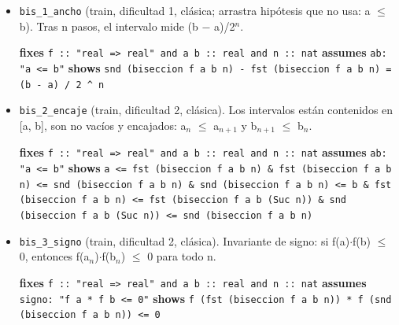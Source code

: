 \documentclass[11pt,a4paper]{article}
\begin{document}
\begin{itemize}
  \item \texttt{bis\_\allowbreak{}1\_\allowbreak{}ancho} (train, dificultad 1, clásica; arrastra hipótesis que no usa: a $\le $ b). Tras n pasos, el intervalo mide (b $-$ a)/2$^{n}$.\\
  {\footnotesize \textbf{fixes} \texttt{f :\allowbreak{}:\allowbreak{} "real =\allowbreak{}> real" and a b :\allowbreak{}:\allowbreak{} real and n :\allowbreak{}:\allowbreak{} nat} \textbf{assumes} \texttt{ab:\allowbreak{} "a <=\allowbreak{} b"} \textbf{shows} \texttt{snd (\allowbreak{}biseccion f a b n) -\allowbreak{} fst (\allowbreak{}biseccion f a b n) =\allowbreak{} (\allowbreak{}b -\allowbreak{} a) /\allowbreak{} 2 \textasciicircum{} n}\par}
  \item \texttt{bis\_\allowbreak{}2\_\allowbreak{}encaje} (train, dificultad 2, clásica). Los intervalos están contenidos en [a, b], son no vacíos y encajados: a$_{n}$ $\le $ a$_{n+1}$ y b$_{n+1}$ $\le $ b$_{n}$.\\
  {\footnotesize \textbf{fixes} \texttt{f :\allowbreak{}:\allowbreak{} "real =\allowbreak{}> real" and a b :\allowbreak{}:\allowbreak{} real and n :\allowbreak{}:\allowbreak{} nat} \textbf{assumes} \texttt{ab:\allowbreak{} "a <=\allowbreak{} b"} \textbf{shows} \texttt{a <=\allowbreak{} fst (\allowbreak{}biseccion f a b n) \&\allowbreak{} fst (\allowbreak{}biseccion f a b n) <=\allowbreak{} snd (\allowbreak{}biseccion f a b n) \&\allowbreak{} snd (\allowbreak{}biseccion f a b n) <=\allowbreak{} b \&\allowbreak{} fst (\allowbreak{}biseccion f a b n) <=\allowbreak{} fst (\allowbreak{}biseccion f a b (\allowbreak{}Suc n)) \&\allowbreak{} snd (\allowbreak{}biseccion f a b (\allowbreak{}Suc n)) <=\allowbreak{} snd (\allowbreak{}biseccion f a b n)}\par}
  \item \texttt{bis\_\allowbreak{}3\_\allowbreak{}signo} (train, dificultad 2, clásica). Invariante de signo: si f(a)$\cdot $f(b) $\le $ 0, entonces f(a$_{n}$)$\cdot $f(b$_{n}$) $\le $ 0 para todo n.\\
  {\footnotesize \textbf{fixes} \texttt{f :\allowbreak{}:\allowbreak{} "real =\allowbreak{}> real" and a b :\allowbreak{}:\allowbreak{} real and n :\allowbreak{}:\allowbreak{} nat} \textbf{assumes} \texttt{signo:\allowbreak{} "f a *\allowbreak{} f b <=\allowbreak{} 0"} \textbf{shows} \texttt{f (\allowbreak{}fst (\allowbreak{}biseccion f a b n)) *\allowbreak{} f (\allowbreak{}snd (\allowbreak{}biseccion f a b n)) <=\allowbreak{} 0}\par}

\end{itemize}
\end{document}

